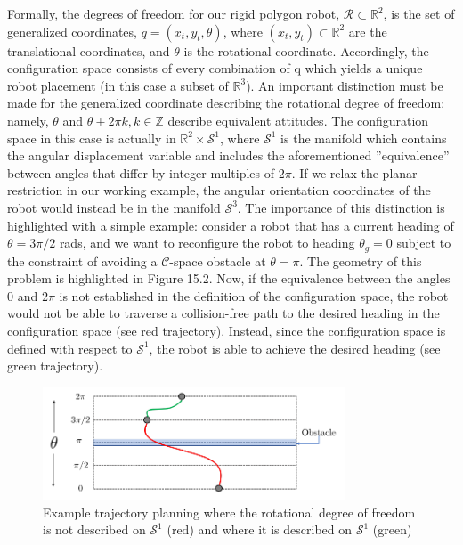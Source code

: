 \documentclass[twoside]{article}
\begin{document}
Formally, the degrees of freedom for our rigid polygon robot, $\mathcal{R} \subset \mathbb{R}^2$, is the set of generalized coordinates, $q = (x_t, y_t, \theta)$, where $(x_t, y_t) \subset \mathbb{R}^2$ are the translational coordinates, and $\theta$ is the rotational coordinate. Accordingly, the configuration space consists of every combination of q which yields a unique robot placement (in this case a subset of $\mathbb{R}^3$). An important distinction must be made for the generalized coordinate describing the rotational degree of freedom; namely, $\theta$ and $\theta \pm 2\pi k, k \in \mathbb{Z}$ describe equivalent attitudes. The configuration space in this case is actually in $\mathbb{R}^2 \times \mathcal{S}^1$, where $\mathcal{S}^1$ is the manifold which contains the angular displacement variable and includes the aforementioned ”equivalence” between angles that differ by integer multiples of $2\pi$. If we relax the planar restriction in our working example, the angular orientation coordinates of the robot would instead be in the manifold $\mathcal{S}^3$. The importance of this distinction is highlighted with a simple example: consider a robot that has a current heading of $\theta = 3\pi/2$ rads, and we want to reconfigure the robot to heading $\theta_g = 0$ subject to the constraint of avoiding a $\mathcal{C}$-space obstacle at $\theta = \pi$. The geometry of this problem is highlighted in Figure 15.2. Now, if the equivalence between the angles 0 and $2\pi$ is not established in the definition of the configuration space, the robot would not be able to traverse a collision-free path to the desired heading in the configuration space (see red trajectory). Instead, since the configuration space is defined with respect to $\mathcal{S}^1$, the robot is able to achieve the desired heading (see green trajectory).

\begin{figure}[ht!]
\begin{center}
\includegraphics[width=0.8\textwidth]{fig15_2.PNG}
\caption{Example trajectory planning where the rotational degree of freedom is not described on $\mathcal{S}^1$ (red) and where it is described on $\mathcal{S}^1$ (green)}
\end{center}
\end{figure}
\end{document}
